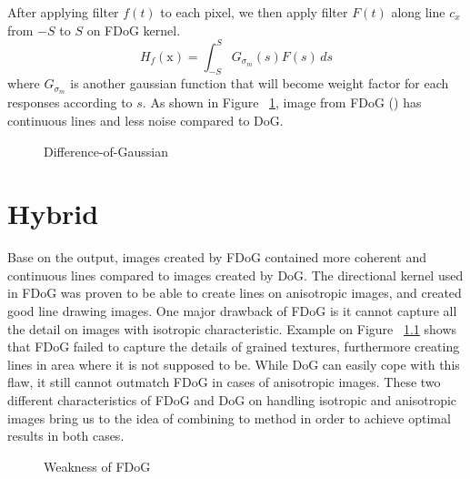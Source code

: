 After applying filter $f(t)$ to each pixel, we then apply filter $F(t)$ along line $c_{x}$ from $-S$ to $S$ on FDoG kernel. 
\begin{equation}
	H_{f}(\mbox{x}) = \int_{-S}^{S} G_{\sigma_{m}}(s)F(s)\,ds
\end{equation}
where $G_{\sigma_{m}}$ is another gaussian function that will become weight factor for each responses according to $s$. As shown in Figure ~\ref{fig:FDoG}, image from FDoG () has continuous lines and less noise compared to DoG.

\begin{figure}[H]
	\centering
	\caption{Difference-of-Gaussian}\label{fig:FDoG}	
\end{figure}


\chapter{Hybrid}
Base on the output, images created by FDoG contained more coherent and continuous lines compared to images created by DoG. The directional kernel used in FDoG was proven to be able to create lines on anisotropic images, and created good line drawing images. One major drawback of FDoG is it cannot capture all the detail on images with isotropic characteristic. Example on Figure ~\ref{fig:FDoGWeakness} shows that FDoG failed to capture the details of grained textures, furthermore creating lines in area where it is not supposed to be. While DoG can easily cope with this flaw, it still cannot outmatch FDoG in cases of anisotropic images. These two different characteristics of FDoG and DoG on handling isotropic and anisotropic images bring us to the idea of combining to method in order to achieve optimal results in both cases.

\begin{figure}[H]
	\centering
	\caption{Weakness of FDoG}\label{fig:FDoGWeakness}
\end{figure}


